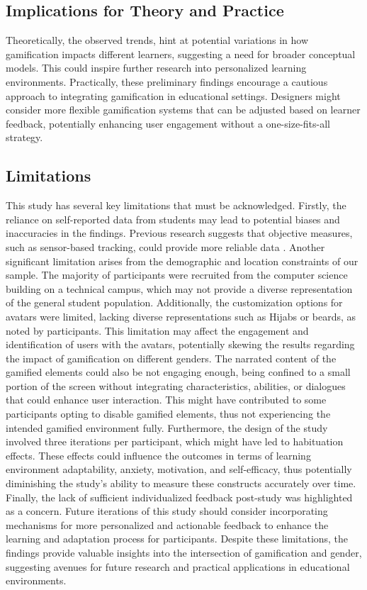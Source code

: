\subsection{Implications for Theory and Practice}
Theoretically, the observed trends, hint at potential variations in how gamification impacts different learners, suggesting a need for broader conceptual models.
This could inspire further research into personalized learning environments.
Practically, these preliminary findings encourage a cautious approach to integrating gamification in educational settings.
Designers might consider more flexible gamification systems that can be adjusted based on learner feedback, potentially enhancing user engagement without a one-size-fits-all strategy.


\subsection{Limitations}
This study has several key limitations that must be acknowledged. Firstly, the reliance on self-reported data from students may lead to potential biases and inaccuracies in the findings. Previous research suggests that objective measures, such as sensor-based tracking, could provide more reliable data \parencite{woolfAffectiveTutorsAutomatic2010}.
Another significant limitation arises from the demographic and location constraints of our sample. The majority of participants were recruited from the computer science building on a technical campus, which may not provide a diverse representation of the general student population.
Additionally, the customization options for avatars were limited, lacking diverse representations such as Hijabs or beards, as noted by participants. This limitation may affect the engagement and identification of users with the avatars, potentially skewing the results regarding the impact of gamification on different genders.
The narrated content of the gamified elements could also be not engaging enough, being confined to a small portion of the screen without integrating characteristics, abilities, or dialogues that could enhance user interaction. This might have contributed to some participants opting to disable gamified elements, thus not experiencing the intended gamified environment fully.
Furthermore, the design of the study involved three iterations per participant, which might have led to habituation effects. These effects could influence the outcomes in terms of learning environment adaptability, anxiety, motivation, and self-efficacy, thus potentially diminishing the study's ability to measure these constructs accurately over time.
Finally, the lack of sufficient individualized feedback post-study was highlighted as a concern. Future iterations of this study should consider incorporating mechanisms for more personalized and actionable feedback to enhance the learning and adaptation process for participants.
Despite these limitations, the findings provide valuable insights into the intersection of gamification and gender, suggesting avenues for future research and practical applications in educational environments.

